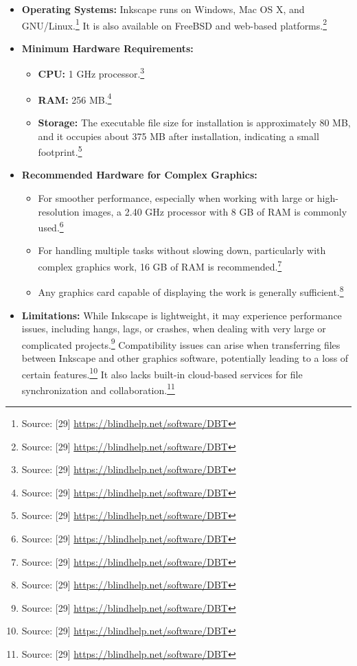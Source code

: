 \begin{itemize}
    \item \textbf{Operating Systems:} Inkscape runs on Windows, Mac OS X, and GNU/Linux.\footnote{Source: [29] \url{https://blindhelp.net/software/DBT}} It is also available on FreeBSD and web-based platforms.\footnote{Source: [29] \url{https://blindhelp.net/software/DBT}}
    \item \textbf{Minimum Hardware Requirements:}
    \begin{itemize}
        \item \textbf{CPU:} 1 GHz processor.\footnote{Source: [29] \url{https://blindhelp.net/software/DBT}}
        \item \textbf{RAM:} 256 MB.\footnote{Source: [29] \url{https://blindhelp.net/software/DBT}}
        \item \textbf{Storage:} The executable file size for installation is approximately 80 MB, and it occupies about 375 MB after installation, indicating a small footprint.\footnote{Source: [29] \url{https://blindhelp.net/software/DBT}}
    \end{itemize}
    \item \textbf{Recommended Hardware for Complex Graphics:}
    \begin{itemize}
        \item For smoother performance, especially when working with large or high-resolution images, a 2.40 GHz processor with 8 GB of RAM is commonly used.\footnote{Source: [29] \url{https://blindhelp.net/software/DBT}}
        \item For handling multiple tasks without slowing down, particularly with complex graphics work, 16 GB of RAM is recommended.\footnote{Source: [29] \url{https://blindhelp.net/software/DBT}}
        \item Any graphics card capable of displaying the work is generally sufficient.\footnote{Source: [29] \url{https://blindhelp.net/software/DBT}}
    \end{itemize}
    \item \textbf{Limitations:} While Inkscape is lightweight, it may experience performance issues, including hangs, lags, or crashes, when dealing with very large or complicated projects.\footnote{Source: [29] \url{https://blindhelp.net/software/DBT}} Compatibility issues can arise when transferring files between Inkscape and other graphics software, potentially leading to a loss of certain features.\footnote{Source: [29] \url{https://blindhelp.net/software/DBT}} It also lacks built-in cloud-based services for file synchronization and collaboration.\footnote{Source: [29] \url{https://blindhelp.net/software/DBT}}
\end{itemize}

